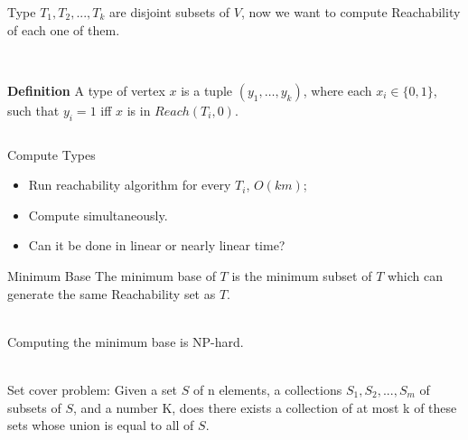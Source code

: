 \begin{frame}{Type}
    $T_1,T_2,...,T_k$ are disjoint subsets of $V$, now we want to compute Reachability of each one of them.\\~\\


    \begin{columns}
    \begin{adjustbox}{width=\textwidth}
    \end{adjustbox}

        \textbf{Definition} A type of vertex $x$ is a tuple $(y_1, \ldots, y_k)$, where each $x_i \in \{0,1\}$, such that $y_i=1$ iff $x$ is in $Reach (T_i, 0)$.
    \end{columns}
\end{frame}
\begin{frame}{Compute Types}
    \begin{itemize}
        \item Run reachability algorithm for every $T_i$, $O(km)$;
        \item Compute simultaneously.
        \item Can it be done in linear or nearly linear time?
    \end{itemize}
\end{frame}
\begin{frame}{Minimum Base}
    The minimum base of $T$ is the minimum subset of $T$ which can generate the same Reachability set as $T$.\\~
    
    Computing the minimum base is NP-hard.\\~
    
    Set cover problem: Given a set $S$ of n elements, a collections $S_1,S_2,...,S_m$ of subsets of $S$, and a number K, does there exists a collection of at most k of these sets whose union is equal to all of $S$.
    
\end{frame}

